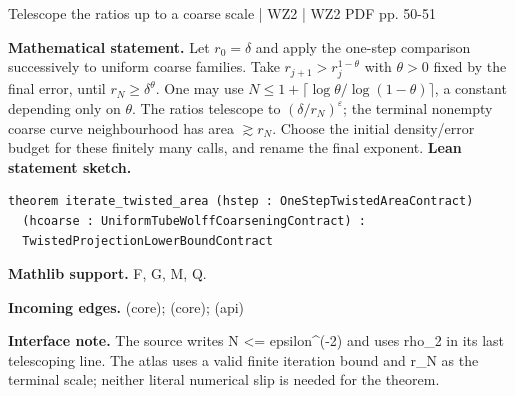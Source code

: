 \documentclass[10pt,a4paper]{article}
\newcommand{\nodecard}[1]{\hyperlink{node-#1}{\texttt{\detokenize{#1}}}}
\begin{document}
\begin{minipage}{\linewidth}
\hypertarget{node-W2Iterate}{}
\begin{tcolorbox}[colback=white,colframe=cinematicfg,colbacktitle=cinematicbg,coltitle=ink,boxrule=0.45pt,arc=1.6mm,left=3mm,right=3mm,top=2mm,bottom=2mm,title={\sffamily\bfseries WZ2 Proposition 7.1: iteration \hfill \texttt{W2Iterate}}]
{\sffamily\small\color{muted}Telescope the ratios up to a coarse scale | WZ2 | WZ2 PDF pp. 50-51}\par
\textbf{Mathematical statement.} Let $r_0=\delta$ and apply the one-step comparison successively to uniform coarse families.
Take $r_{j+1}>r_j^{1-\theta}$ with $\theta>0$ fixed by the final error, until $r_N\ge\delta^\theta$.
One may use
$N\le 1+\lceil\log\theta/\log(1-\theta)\rceil$, a constant depending only on $\theta$.
The ratios telescope to $(\delta/r_N)^\varepsilon$; the terminal nonempty coarse curve neighbourhood has area $\gtrsim r_N$.
Choose the initial density/error budget for these finitely many calls, and rename the final exponent.
\smallskip\textbf{Lean statement sketch.}
\begin{Verbatim}[fontsize=\small,breaklines=true,breakanywhere=true,tabsize=2]
theorem iterate_twisted_area (hstep : OneStepTwistedAreaContract)
  (hcoarse : UniformTubeWolffCoarseningContract) :
  TwistedProjectionLowerBoundContract
\end{Verbatim}
{\footnotesize\textbf{Mathlib support.} F, G, M, Q.\par
\textbf{Incoming edges.} \nodecard{W2L7_12} (core); \nodecard{IcoarseTW} (core); \nodecard{Iparams} (api)\par}
{\footnotesize\textbf{Interface note.} The source writes N <= epsilon\textasciicircum{}(-2) and uses rho\_2 in its last telescoping line. The atlas uses a valid finite iteration bound and r\_N as the terminal scale; neither literal numerical slip is needed for the theorem.}
\end{tcolorbox}\end{minipage}\par\medskip
\end{document}
